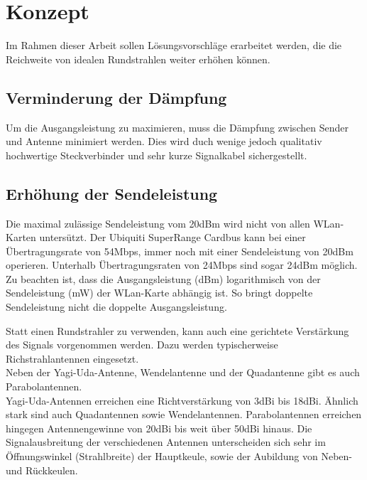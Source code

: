 \documentclass[oneside,11pt,parskip=half,ngerman]{scrreprt}
\begin{document}
\chapter{Konzept}\label{konzept}

Im Rahmen dieser Arbeit sollen Lösungsvorschläge erarbeitet werden, die
die Reichweite von idealen Rundstrahlen weiter erhöhen können.

\section{Verminderung der Dämpfung}\label{verminderung-der-duxe4mpfung}

Um die Ausgangsleistung zu maximieren, muss die Dämpfung zwischen Sender
und Antenne minimiert werden. Dies wird duch wenige jedoch qualitativ
hochwertige Steckverbinder und sehr kurze Signalkabel sichergestellt.

\section{Erhöhung der
Sendeleistung}\label{erhuxf6hung-der-sendeleistung}

Die maximal zulässige Sendeleistung vom 20dBm wird nicht von allen
WLan-Karten untersützt. Der Ubiquiti SuperRange Cardbus kann bei einer
Übertragungsrate von 54Mbps, immer noch mit einer Sendeleistung von
20dBm operieren. Unterhalb Übertragungsraten von 24Mbps sind sogar 24dBm
möglich.\\

Zu beachten ist, dass die Ausgangsleistung (dBm) logarithmisch von der
Sendeleistung (mW) der WLan-Karte abhängig ist. So bringt doppelte
Sendeleistung nicht die doppelte Ausgangsleistung.


Statt einen Rundstrahler zu verwenden, kann auch eine gerichtete
Verstärkung des Signals vorgenommen werden. Dazu werden typischerweise
Richstrahlantennen eingesetzt.\\Neben der Yagi-Uda-Antenne,
Wendelantenne und der Quadantenne gibt es auch
Parabolantennen.\\Yagi-Uda-Antennen erreichen eine Richtverstärkung von
3dBi bis 18dBi. Ähnlich stark sind auch Quadantennen sowie
Wendelantennen. Parabolantennen erreichen hingegen Antennengewinne von
20dBi bis weit über 50dBi hinaus. Die Signalausbreitung der
verschiedenen Antennen unterscheiden sich sehr im Öffnungswinkel
(Strahlbreite) der Hauptkeule, sowie der Aubildung von Neben- und
Rückkeulen.
\end{document}

